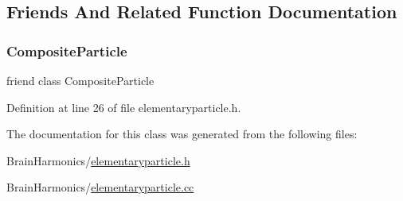\subsection{Friends And Related Function Documentation}
\mbox{\label{class_elementary_particle_a8be5cf46db5f9876c49d58e4ab84044b}} 
\subsubsection{\texorpdfstring{Composite\+Particle}{CompositeParticle}}
{\footnotesize\ttfamily friend class Composite\+Particle\hspace{0.3cm}{\ttfamily [friend]}}



Definition at line 26 of file elementaryparticle.\+h.



The documentation for this class was generated from the following files\+:\begin{DoxyCompactItemize}
\item 
Brain\+Harmonics/\hyperlink{elementaryparticle_8h}{elementaryparticle.\+h}\item 
Brain\+Harmonics/\hyperlink{elementaryparticle_8cc}{elementaryparticle.\+cc}\end{DoxyCompactItemize}
